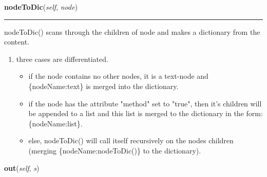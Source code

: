 \hspace{.8\funcindent}\begin{boxedminipage}{\funcwidth}

    \raggedright \textbf{nodeToDic}(\textit{self}, \textit{node})

    \vspace{-1.5ex}

    \rule{\textwidth}{0.5\fboxrule}
\setlength{\parskip}{2ex}
    nodeToDic() scans through the children of node and makes a dictionary 
    from the content.

    \begin{enumerate}

    \setlength{\parskip}{0.5ex}
      \item three cases are differentiated.

        \begin{itemize}
        \setlength{\parskip}{0.6ex}
          \item if the node contains no other nodes, it is a text-node and 
            \{nodeName:text\} is merged into the dictionary.

          \item if the node has the attribute "method" set to "true", then it's
            children will be appended to a list and this list is merged to 
            the dictionary in the form: \{nodeName:list\}.

          \item else, nodeToDic() will call itself recursively on the nodes 
            children (merging \{nodeName:nodeToDic()\} to the dictionary).

        \end{itemize}

    \end{enumerate}

\setlength{\parskip}{1ex}
    \end{boxedminipage}

    \label{cuon:Reports:MyXML:MyXML:out}

    \vspace{0.5ex}

\hspace{.8\funcindent}\begin{boxedminipage}{\funcwidth}

    \raggedright \textbf{out}(\textit{self}, \textit{s})

\setlength{\parskip}{2ex}
\setlength{\parskip}{1ex}
    \end{boxedminipage}

